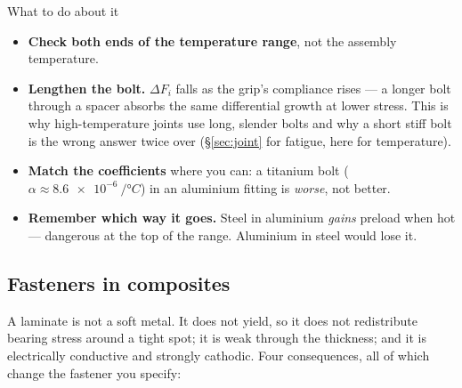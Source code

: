 \documentclass[11pt,a4paper]{article}
\begin{document}
\begin{keybox}{What to do about it}
\begin{itemize}[leftmargin=*,itemsep=1pt]
\item \textbf{Check both ends of the temperature range}, not the assembly temperature.
\item \textbf{Lengthen the bolt.} $\Delta F_i$ falls as the grip's compliance rises --- a longer
  bolt through a spacer absorbs the same differential growth at lower stress. This is why
  high-temperature joints use long, slender bolts and why a short stiff bolt is the wrong answer
  twice over (\S\ref{sec:joint} for fatigue, here for temperature).
\item \textbf{Match the coefficients} where you can: a titanium bolt
  ($\alpha\approx\SI{8.6e-6}{/\degree C}$) in an aluminium fitting is \emph{worse}, not better.
\item \textbf{Remember which way it goes.} Steel in aluminium \emph{gains} preload when hot ---
  dangerous at the top of the range. Aluminium in steel would lose it.
\end{itemize}
\end{keybox}

\subsection{Fasteners in composites}

A laminate is not a soft metal. It does not yield, so it does not redistribute bearing stress around
a tight spot; it is weak through the thickness; and it is electrically conductive and strongly
cathodic. Four consequences, all of which change the fastener you specify:
\end{document}
